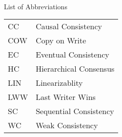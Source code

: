 

\renewcommand{\baselinestretch}{1}
\small\normalsize
\hbox{\ }

\vspace{-4em}

\begin{center}
\large{List of Abbreviations}
\end{center}

\vspace{3pt}

\begin{supertabular}{ll}
CC & Causal Consistency \\
COW & Copy on Write \\
EC & Eventual Consistency \\
HC & Hierarchical Consensus \\
LIN & Linearizablity \\
LWW & Last Writer Wins \\
SC & Sequential Consistency \\
WC & Weak Consistency \\

\end{supertabular}

